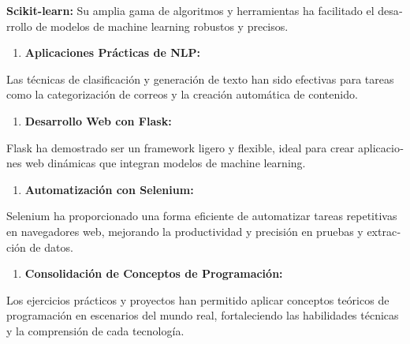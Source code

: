 \documentclass[letterpaper]{article}
\begin{document}
{
\foreignlanguage{spanish}{\textbf{Scikit-learn:}}\foreignlanguage{spanish}{ Su amplia gama de algoritmos y herramientas
ha facilitado el desarrollo de modelos de machine learning robustos y precisos.}}

\begin{enumerate}[resume*=listWWNumxi]
\item {
\foreignlanguage{spanish}{\textbf{Aplicaciones Prácticas de NLP:}}}
\end{enumerate}
{
\foreignlanguage{spanish}{Las técnicas de clasificación y generación de texto han sido efectivas para tareas como la
categorización de correos y la creación automática de contenido.}}

\begin{enumerate}[resume*=listWWNumxi]
\item {
\foreignlanguage{spanish}{\textbf{Desarrollo Web con Flask:}}}
\end{enumerate}
{
\foreignlanguage{spanish}{Flask ha demostrado ser un framework ligero y flexible, ideal para crear aplicaciones web
dinámicas que integran modelos de machine learning.}}

\begin{enumerate}[resume*=listWWNumxi]
\item {
\foreignlanguage{spanish}{\textbf{Automatización con Selenium:}}}
\end{enumerate}
{
\foreignlanguage{spanish}{Selenium ha proporcionado una forma eficiente de automatizar tareas repetitivas en navegadores
web, mejorando la productividad y precisión en pruebas y extracción de datos.}}

\begin{enumerate}[resume*=listWWNumxi]
\item {
\foreignlanguage{spanish}{\textbf{Consolidación de Conceptos de Programación:}}}
\end{enumerate}
{
\foreignlanguage{spanish}{Los ejercicios prácticos y proyectos han permitido aplicar conceptos teóricos de programación
en escenarios del mundo real, fortaleciendo las habilidades técnicas y la comprensión de cada tecnología.}}


\bigskip


\bigskip


\bigskip


\bigskip
\end{document}
